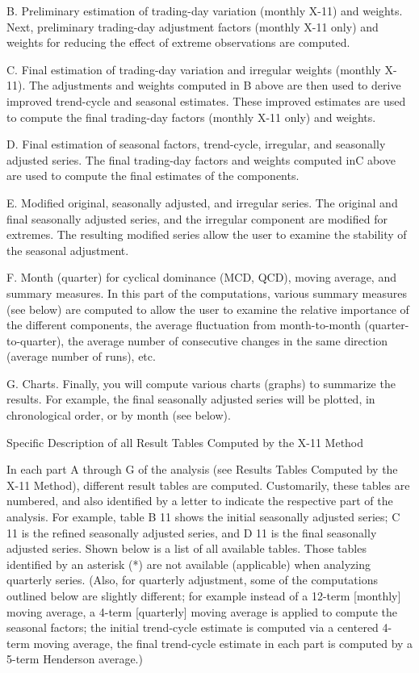 B.
Preliminary estimation of trading-day variation (monthly X-11) and weights. Next, preliminary trading-day adjustment factors (monthly X-11 only) and weights for reducing the effect of extreme observations are computed.

C.
Final estimation of trading-day variation and irregular weights (monthly X- 11). The adjustments and weights computed in B above are then used to derive improved trend-cycle and seasonal estimates. These improved estimates are used to compute the final trading-day factors (monthly X-11 only) and weights.

D.
Final estimation of seasonal factors, trend-cycle, irregular, and seasonally adjusted series. The final trading-day factors and weights computed inC above are used to compute the final estimates of the components.

E.
Modified original, seasonally adjusted, and irregular series. The original and final seasonally adjusted series, and the irregular component are modified for extremes. The resulting modified series allow the user to examine the stability of the seasonal adjustment.

F.
Month (quarter) for cyclical dominance (MCD, QCD), moving average, and summary measures. In this part of the computations, various summary measures (see below) are computed to allow the user to examine the relative importance of the different components, the average fluctuation from month-to-month (quarter-to-quarter), the average number of consecutive changes in the same direction (average number of runs), etc.

G.
Charts. Finally, you will compute various charts (graphs) to summarize the results. For example, the final seasonally adjusted series will be plotted, in chronological order, or by month (see below).


Specific Description of all Result Tables Computed by the X-11 Method

In each part A through G of the analysis (see Results Tables Computed by the X-11 Method), different result tables are computed. Customarily, these tables are numbered, and also identified by a letter to indicate the respective part of the analysis. For example, table B 11 shows the initial seasonally adjusted series; C 11 is the refined seasonally adjusted series, and D 11 is the final seasonally adjusted series. Shown below is a list of all available tables. Those tables identified by an asterisk (*) are not available (applicable) when analyzing quarterly series. (Also, for quarterly adjustment, some of the computations outlined below are slightly different; for example instead of a 12-term [monthly] moving average, a 4-term [quarterly] moving average is applied to compute the seasonal factors; the initial trend-cycle estimate is computed via a centered 4-term moving average, the final trend-cycle estimate in each part is computed by a 5-term Henderson average.)

